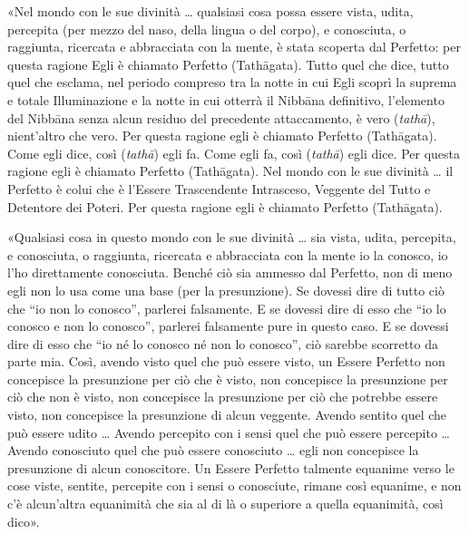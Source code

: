 
«Nel mondo con le sue divinità … qualsiasi cosa possa essere vista, udita,
percepita (per mezzo del naso, della lingua o del corpo), e conosciuta, o
raggiunta, ricercata e abbracciata con la mente, è stata scoperta dal Perfetto:
per questa ragione Egli è chiamato Perfetto (Tathāgata). Tutto quel che dice,
tutto quel che esclama, nel periodo compreso tra la notte in cui Egli scoprì la
suprema e totale Illuminazione e la notte in cui otterrà il Nibbāna definitivo,
l’elemento del Nibbāna senza alcun residuo del precedente attaccamento, è vero
(\emph{tathā}), nient’altro che vero. Per questa ragione egli è chiamato
Perfetto (Tathāgata). Come egli dice, così (\emph{tathā}) egli fa. Come egli fa,
così (\emph{tathā}) egli dice. Per questa ragione egli è chiamato Perfetto
(Tathāgata). Nel mondo con le sue divinità … il Perfetto è colui che è l’Essere
Trascendente Intrasceso, Veggente del Tutto e Detentore dei Poteri. Per questa
ragione egli è chiamato Perfetto (Tathāgata).


«Qualsiasi cosa in questo mondo con le sue divinità … sia vista, udita,
percepita, e conosciuta, o raggiunta, ricercata e abbracciata con la mente io la
conosco, io l’ho direttamente conosciuta. Benché ciò sia ammesso dal Perfetto,
non di meno egli non lo usa come una base (per la presunzione). Se dovessi dire
di tutto ciò che “io non lo conosco”, parlerei falsamente. E se dovessi dire di
esso che “io lo conosco e non lo conosco”, parlerei falsamente pure in questo
caso. E se dovessi dire di esso che “io né lo conosco né non lo conosco”, ciò
sarebbe scorretto da parte mia. Così, avendo visto quel che può essere visto, un
Essere Perfetto non concepisce la presunzione
per ciò che è visto, non concepisce la presunzione per ciò che non è visto, non
concepisce la presunzione per ciò che potrebbe essere visto, non concepisce la
presunzione di alcun veggente. Avendo sentito quel che può essere udito … Avendo
percepito con i sensi quel che può essere percepito … Avendo conosciuto quel che
può essere conosciuto … egli non concepisce la presunzione di alcun conoscitore.
Un Essere Perfetto talmente equanime verso le cose viste, sentite, percepite con
i sensi o conosciute, rimane così equanime, e non c’è alcun’altra equanimità che
sia al di là o superiore a quella equanimità, così dico».

